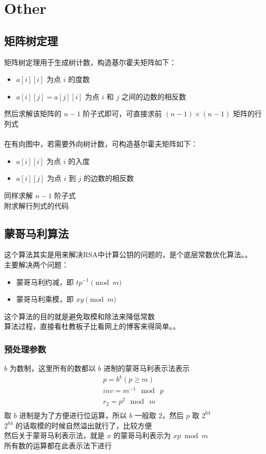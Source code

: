 %
%
	\newpage
	\section{Other}
	\subsection{矩阵树定理}
	矩阵树定理用于生成树计数，构造基尔霍夫矩阵如下：
	\begin{itemize}
		\item $a[i][i]$ 为点 $i$ 的度数
		\item $a[i][j]=a[j][i]$ 为点 $i$ 和 $j$ 之间的边数的相反数
	\end{itemize}
	然后求解该矩阵的 $n-1$ 阶子式即可，可直接求前 $(n-1)\times(n-1)$ 矩阵的行列式\\
	\vspace{1cm}
	~\\
	在有向图中，若需要外向树计数，可构造基尔霍夫矩阵如下：
	\begin{itemize}
		\item $a[i][i]$ 为点 $i$ 的入度
		\item $a[i][j]$ 为点 $i$ 到 $j$ 的边数的相反数
	\end{itemize}
	同样求解 $n-1$ 阶子式
	\vspace{1cm}
	~\\
	附求解行列式的代码
	
	
	\newpage
	\subsection{蒙哥马利算法}
	这个算法其实是用来解决RSA中计算公钥的问题的，是个底层常数优化算法。。\\
	主要解决两个问题：
	\begin{itemize}
		\item 蒙哥马利约减，即 $tp^{-1} \pmod m$
		\item 蒙哥马利乘模，即 $xy \pmod m$
	\end{itemize}
	这个算法的目的就是避免取模和除法来降低常数\\
	算法过程，直接看杜教板子比看网上的博客来得简单。。\\
	\subsubsection{预处理参数}
	$b$ 为数制，这里所有的数都以 $b$ 进制的蒙哥马利表示法表示\\
	$$
	\begin{aligned}
	p=b^k (p\ge m)\\
	inv=m^{-1}\ \bmod\ p\\
	r_2=p^2\ \bmod\ m\\
	\end{aligned}	
	$$
	取 $b$ 进制是为了方便进行位运算，所以 $b$ 一般取 $2$，然后 $p$ 取 $2^{64}$\\
	$2^{64}$ 的话取模的时候自然溢出就行了，比较方便\\
	然后关于蒙哥马利表示法，就是 $x$ 的蒙哥马利表示为 $xp \bmod m$\\
	所有数的运算都在此表示法下进行\\
